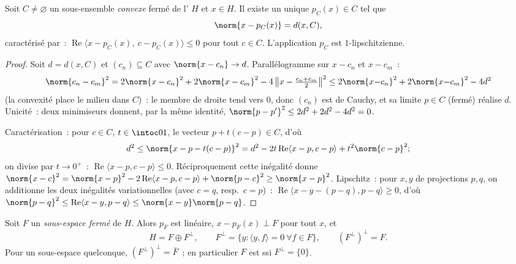 \begin{theorem}
\label{thm:b3:hilbert:projection}
Soit $C \neq \varnothing$ un sous-ensemble \emph{convexe}
fermé de l' $H$ et $x \in H$. Il existe un
unique $p_C(x) \in C$ tel que
\[
\norm{x - p_C(x)} = d(x, C),
\]
caractérisé par~: $\operatorname{Re}\langle x - p_C(x),\ c -
p_C(x)\rangle \leq 0$ pour tout $c \in C$. L'application
$p_C$ est $1$-lipschitzienne.
\end{theorem}

\begin{proof}
Soit $d = d(x, C)$ et $(c_n) \subseteq C$ avec $\norm{x -
c_n} \to d$. Parallélogramme sur $x - c_n$ et $x - c_m$~:
\[
\norm{c_n - c_m}^2 = 2\norm{x - c_n}^2 + 2\norm{x - c_m}^2 -
4\,\bigl\|x - \tfrac{c_n + c_m}2\bigr\|^2
\leq 2\norm{x{-}c_n}^2 + 2\norm{x{-}c_m}^2 - 4d^2
\]
(la convexité place le milieu dans $C$)~: le membre de droite
tend vers $0$, donc $(c_n)$ est de Cauchy, et sa limite $p
\in C$ (fermé) réalise $d$. Unicité~: deux minimiseurs
donnent, par la même identité, $\norm{p - p'}^2 \leq 2d^2 +
2d^2 - 4d^2 = 0$.

Caractérisation~: pour $c \in C$, $t \in \intoc01$, le
vecteur $p + t(c - p) \in C$, d'où
\[
d^2 \leq \norm{x - p - t(c-p)}^2
= d^2 - 2t\operatorname{Re}\langle x - p, c - p\rangle +
t^2\norm{c-p}^2 ;
\]
on divise par $t \to 0^+$~: $\operatorname{Re}\langle x - p,
c - p\rangle \leq 0$. Réciproquement cette inégalité donne
$\norm{x - c}^2 = \norm{x - p}^2 - 2\operatorname{Re}\langle
x - p, c - p\rangle + \norm{p - c}^2 \geq \norm{x-p}^2$.
Lipschitz~: pour $x, y$ de projections $p, q$, on additionne
les deux inégalités variationnelles (avec $c = q$, resp.\
$c = p$)~: $\operatorname{Re}\langle x - y - (p - q), p -
q\rangle \geq 0$, d'où $\norm{p - q}^2 \leq
\operatorname{Re}\langle x - y, p - q\rangle \leq \norm{x -
y}\norm{p - q}$.
\end{proof}

\begin{theorem}
\label{thm:b3:hilbert:decomposition}
Soit $F$ un \emph{sous-espace fermé} de $H$. Alors $p_F$ est
linéaire, $x - p_F(x) \perp F$ pour tout $x$, et\index{orthogonal
complement}
\[
H = F \oplus F^\perp,
\qquad F^\perp = \{y : \langle y, f\rangle = 0\ \forall f\in
F\},
\qquad (F^\perp)^\perp = F .
\]
Pour un sous-espace quelconque, $(F^\perp)^\perp = \bar F$~; en
particulier $F$ est  ssi $F^\perp = \{0\}$.
\end{theorem}

